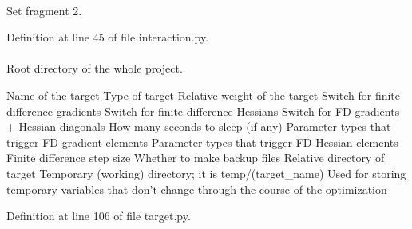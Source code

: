 \hypertarget{classforcebalance_1_1interaction_1_1Interaction_a98d153938051d0290f3164f28305f160}{
\paragraph[{select2}]{}}\label{classforcebalance_1_1interaction_1_1Interaction_a98d153938051d0290f3164f28305f160}


\-Set fragment 2. 



\-Definition at line 45 of file interaction.\-py.

\hypertarget{classforcebalance_1_1target_1_1Target_aede2856573b890cd47054ad36937d6f6}{
\paragraph[{tempdir}]{}}\label{classforcebalance_1_1target_1_1Target_aede2856573b890cd47054ad36937d6f6}


\-Root directory of the whole project. 

\-Name of the target \-Type of target \-Relative weight of the target \-Switch for finite difference gradients \-Switch for finite difference \-Hessians \-Switch for \-F\-D gradients + \-Hessian diagonals \-How many seconds to sleep (if any) \-Parameter types that trigger \-F\-D gradient elements \-Parameter types that trigger \-F\-D \-Hessian elements \-Finite difference step size \-Whether to make backup files \-Relative directory of target \-Temporary (working) directory; it is temp/(target\-\_\-name) \-Used for storing temporary variables that don't change through the course of the optimization 

\-Definition at line 106 of file target.\-py.

\hypertarget{classforcebalance_1_1interaction_1_1Interaction_a3deec07ef2fea43d2282c0a2831e3a53}{
\paragraph[{traj}]{}}\label{classforcebalance_1_1interaction_1_1Interaction_a3deec07ef2fea43d2282c0a2831e3a53}


